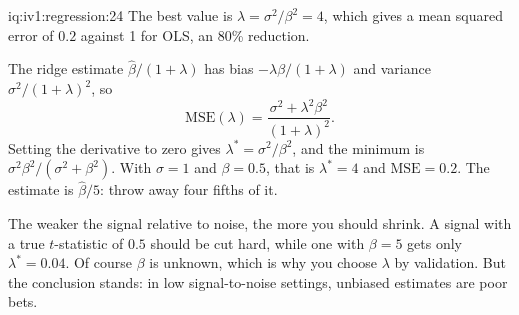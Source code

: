 \begin{solution}{iq:iv1:regression:24}
The best value is $\lambda = \sigma^2/\beta^2 = 4$, which gives a mean squared error of $0.2$ against 1 for OLS, an 80\% reduction.

The ridge estimate $\hat\beta/(1 + \lambda)$ has bias $-\lambda\beta/(1 + \lambda)$ and variance $\sigma^2/(1 + \lambda)^2$, so
\[
\mathrm{MSE}(\lambda) = \frac{\sigma^2 + \lambda^2\beta^2}{(1 + \lambda)^2}.
\]
Setting the derivative to zero gives $\lambda^* = \sigma^2/\beta^2$, and the minimum is $\sigma^2\beta^2/(\sigma^2 + \beta^2)$. With $\sigma = 1$ and $\beta = 0.5$, that is $\lambda^* = 4$ and $\mathrm{MSE} = 0.2$. The estimate is $\hat\beta/5$: throw away four fifths of it.

The weaker the signal relative to noise, the more you should shrink. A signal with a true $t$-statistic of $0.5$ should be cut hard, while one with $\beta = 5$ gets only $\lambda^* = 0.04$. Of course $\beta$ is unknown, which is why you choose $\lambda$ by validation. But the conclusion stands: in low signal-to-noise settings, unbiased estimates are poor bets.

\end{solution}

